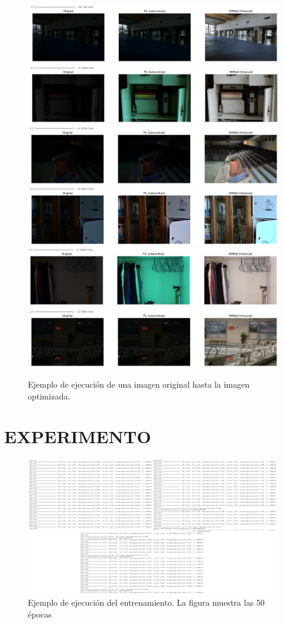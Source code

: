 \documentclass[a4paper,
               ]{jacow}
\begin{document}
\begin{figure}[!h]
    \centering
    \includegraphics*[width=.5\textwidth]{ll-1}
    \includegraphics*[width=.5\textwidth]{ll-2}
    \includegraphics*[width=.5\textwidth]{ll-3}
    \includegraphics*[width=.5\textwidth]{ll-4}
    \includegraphics*[width=.5\textwidth]{ll-5}
    \includegraphics*[width=.5\textwidth]{ll-6}
    \caption{Ejemplo de ejecución de una imagen original hasta la imagen optimizada.}
    \label{fig:ejem_procesamiento}
\end{figure}

\section{EXPERIMENTO}


\begin{figure}[!h]
    \centering
    \includegraphics*[width=.9\textwidth]{entrenamiento}
    \caption{Ejemplo de ejecución del entrenamiento. La figura muestra las 50 épocas }
    \label{fig:ejem_Entrenamiento}
\end{figure}
\end{document}
